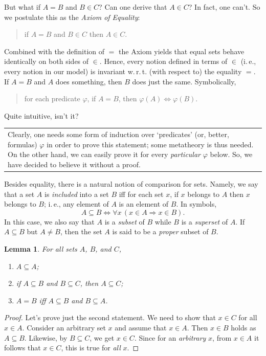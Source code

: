 \documentclass[12pt,notitlepage]{article}
\theoremstyle{plain}
\newtheorem{lemma}[thm]{Lemma}
\theoremstyle{definition}
\theoremstyle{plain}
\newcommand{\sbs}{\subseteq}
\renewcommand{\phi}{\varphi}
\newcommand{\1}{\mathbf{1}}
\newcommand{\0}{\mathbf{0}}
\newcommand{\ply}{\Longrightarrow}
\newcommand{\mcomm}[1]{
\medskip\noindent\begin{tabular}{| l}
\parbox{0.99\textwidth}{{\small
#1 }}\end{tabular}
\smallskip}
\begin{document}
But what if $A = B$ and $B \in C$? Can one derive that $A \in C$? In fact, one can't. So we postulate this as the \emph{Axiom of Equality}:
\begin{quote}
if $A = B$ and $B \in C$ then $A \in C$.
\end{quote}
Combined with the definition of ${=}$ the Axiom yields that equal sets behave identically on both sides of ${\in}$. Hence, every notion defined in terms of ${\in}$ (i.\,e., every notion in our model) is invariant w.\,r.\,t. (with respect to) the equality ${=}$. If $A = B$ and $A$ does something, then $B$ does just the same. Symbolically,
\begin{quote}
for each predicate $\phi$, if $A = B$, then $\phi(A) \iff \phi(B)$.
\end{quote}
Quite intuitive, isn't it? 

\mcomm{Clearly, one needs some form of induction over `predicates' (or, better, formulas) $\phi$ in order to prove this statement; some metatheory is thus needed. On the other hand, we can easily prove it for every \emph{particular} $\phi$ below. So, we have decided to believe it without a proof. }

Besides equality, there is a natural notion of comparison for sets. Namely, we say that a set $A$ is \emph{included} into a set $B$ iff for each set $x$, if $x$ belongs to $A$ then $x$ belongs to $B$; i.\,e., any element of $A$ is an element of $B$. In symbols,
$$A \sbs B \iff \forall x\, (x \in A \ply x \in B).$$
In this case, we also say that $A$ is a \emph{subset} of $B$ while $B$ is a \emph{superset} of $A$. If $A \sbs B$ but $A \neq B$, then the set $A$ is said to be a \emph{proper} subset of $B$.

\begin{lemma}\label{ch0:subset}
For all sets $A$, $B$, and $C$,
\begin{enumerate}
\item $A \sbs A$;
\item if $A \sbs B$ and $B \sbs C$, then $A \sbs C$;
\item $A = B$ iff $A \sbs B$ and $B \sbs A$.
\end{enumerate}
\end{lemma}
\begin{proof}
Let's prove just the second statement. We need to show that $x \in C$ for all $x \in A$. Consider an arbitrary set $x$ and assume that $x \in A$. Then $x \in B$ holds as $A \sbs B$. Likewise, by $B \sbs C$, we get $x \in C$. Since for an \emph{arbitrary} $x$, from $x \in A$ it follows that $x \in C$, this is true for \emph{all} $x$.
\end{proof}
\end{document}
